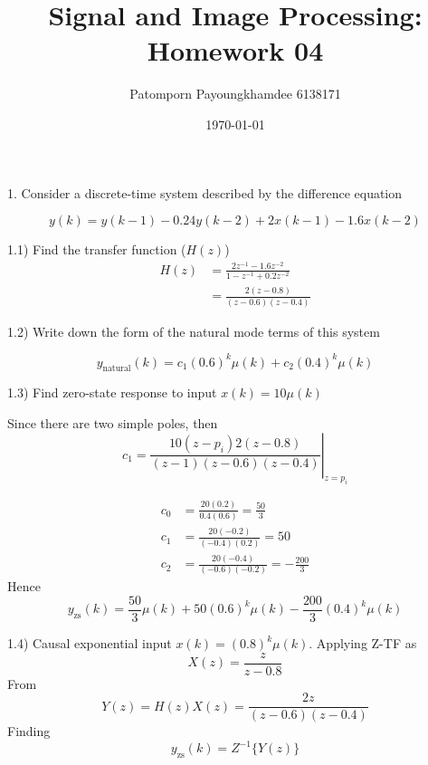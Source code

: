 \documentclass[12pt]{article}
\title{Signal and Image Processing: Homework 04}
\author{Patomporn Payoungkhamdee 6138171}
\date{\today}
\begin{document}
\maketitle

1. Consider a discrete-time system described by the difference equation

\begin{equation*}
y(k) = y(k-1) - 0.24y(k-2) + 2x(k-1) - 1.6x(k-2)
\end{equation*}

1.1) Find the transfer function ($H(z)$)
\begin{equation*}
\begin{split}
    H(z) &= \frac{2z^{-1} - 1.6z^{-2}}{1-z^{-1}+0.2z^{-2}} \\
    &= \frac{2(z-0.8)}{(z-0.6)(z-0.4)}
\end{split}
\end{equation*}

1.2) Write down the form of the natural mode terms of this system

\begin{equation*}
y_\text{natural}(k) = c_1(0.6)^k\mu(k) + c_2 (0.4)^k\mu(k)
\end{equation*}

1.3) Find zero-state response to input $x(k) = 10\mu(k)$

Since there are two simple poles, then
\begin{equation*}
    c_1 = \left.\frac{10(z-p_i)2(z-0.8)}{(z-1)(z-0.6)(z-0.4)}\right|_{z=p_i}
\end{equation*}

\begin{equation*}
\begin{split}
c_0 &= \frac{20(0.2)}{0.4(0.6)} = \frac{50}{3} \\
c_1 &= \frac{20(-0.2)}{(-0.4)(0.2)} = 50 \\
c_2 &= \frac{20(-0.4)}{(-0.6)(-0.2)} = -\frac{200}{3} 
\end{split}
\end{equation*}
Hence
\begin{equation*}
    y_\text{zs}(k) = \frac{50}{3}\mu(k) + 50(0.6)^k\mu(k) - \frac{200}{3}(0.4)^k\mu(k)
\end{equation*}

1.4) Causal exponential input $x(k) = (0.8)^k\mu(k)$. Applying Z-TF as
\begin{equation*}
    X(z) = \frac{z}{z-0.8}
\end{equation*}
From
\begin{equation*}
    Y(z) = H(z)X(z) = \frac{2z}{(z-0.6)(z-0.4)}
\end{equation*}
Finding 
\begin{equation*}
    y_\text{zs}(k) = Z^{-1}\{Y(z)\}
\end{equation*}
\end{document}
